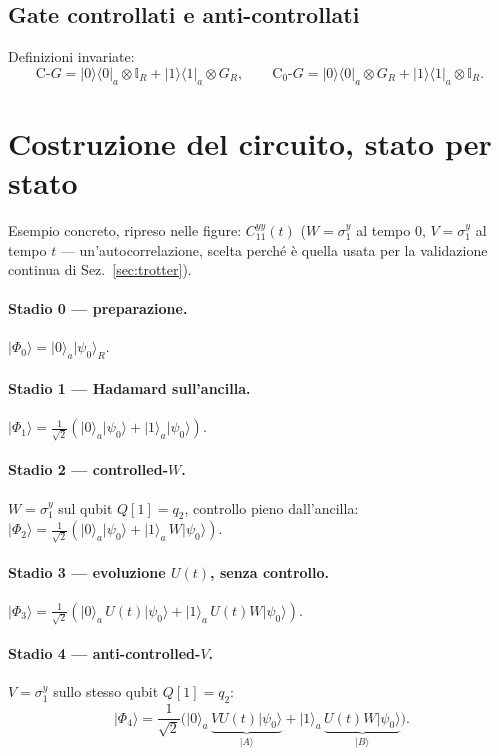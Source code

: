 \documentclass[11pt,a4paper]{article}
\newcommand{\ket}[1]{\lvert #1\rangle}
\newcommand{\bra}[1]{\langle #1\rvert}
\begin{document}
\subsection{Gate controllati e anti-controllati}

Definizioni invariate:
\begin{equation}
\mathrm{C}\text{-}G = \ket0\!\bra0_a\otimes\mathbb I_R + \ket1\!\bra1_a\otimes G_R,
\qquad
\mathrm{C}_0\text{-}G = \ket0\!\bra0_a\otimes G_R + \ket1\!\bra1_a\otimes\mathbb I_R.
\end{equation}

\section{Costruzione del circuito, stato per stato}

Esempio concreto, ripreso nelle figure: $C_{11}^{yy}(t)$ ($W=\sigma_1^y$ al tempo $0$,
$V=\sigma_1^y$ al tempo $t$ --- un'autocorrelazione, scelta perché è quella usata per la
validazione continua di Sez.~\ref{sec:trotter}).

\paragraph{Stadio 0 --- preparazione.} $\ket{\Phi_0}=\ket0_a\ket{\psi_0}_R$.

\paragraph{Stadio 1 --- Hadamard sull'ancilla.}
$\ket{\Phi_1}=\tfrac1{\sqrt2}(\ket0_a\ket{\psi_0}+\ket1_a\ket{\psi_0})$.

\paragraph{Stadio 2 --- controlled-$W$.} $W=\sigma_1^y$ sul qubit $Q[1]=q_2$, controllo pieno
dall'ancilla: $\ket{\Phi_2}=\tfrac1{\sqrt2}(\ket0_a\ket{\psi_0}+\ket1_a\,W\ket{\psi_0})$.

\paragraph{Stadio 3 --- evoluzione $U(t)$, senza controllo.}
$\ket{\Phi_3}=\tfrac1{\sqrt2}(\ket0_a\,U(t)\ket{\psi_0}+\ket1_a\,U(t)W\ket{\psi_0})$.

\paragraph{Stadio 4 --- anti-controlled-$V$.} $V=\sigma_1^y$ sullo stesso qubit $Q[1]=q_2$:
\begin{equation}
\boxed{\;\ket{\Phi_4}=\frac1{\sqrt2}\Big(\ket0_a\,\underbrace{VU(t)\ket{\psi_0}}_{\ket A}
+\ket1_a\,\underbrace{U(t)W\ket{\psi_0}}_{\ket B}\Big).}
\label{eq:phi4}
\end{equation}
\end{document}
